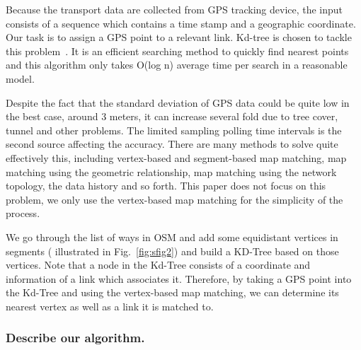 \documentclass{acm_proc_article-sp}
\begin{document}
	Because the transport data are collected from GPS tracking device, the input consists of a sequence which contains a time stamp and a geographic coordinate. Our task is to assign a GPS point to a relevant link. Kd-tree is chosen to tackle this problem~\cite{moh2013approximate}. It is an efficient searching method to quickly find nearest points and this algorithm only takes O(log n) average time per search in a reasonable model.
	
	\setlength{\parindent}{0.7cm} Despite the fact that the standard deviation of GPS data could be quite low in the best case, around 3 meters, it can increase several fold due to tree cover, tunnel and other problems. The limited sampling polling time intervals is the second source affecting the accuracy. There are many methods to solve quite effectively this, including vertex-based and segment-based map matching, map matching using the geometric relationship, map matching using the network topology, the data history and so forth. This paper does not focus on this problem, we only use the vertex-based map matching for the simplicity of the process.  
	
	
	\setlength{\parindent}{0.7cm} We go through the list of ways in OSM and add some equidistant vertices in segments ( illustrated in Fig.~\ref{fig:sfig2}) and build a KD-Tree based on those vertices. Note that a node in the Kd-Tree consists of a coordinate and information of a link which associates it. Therefore, by taking a GPS point into the Kd-Tree and using the vertex-based map matching, we can determine its nearest vertex as well as a link it is matched to.
	
	\subsubsection{Describe our algorithm.}
		
\end{document}
